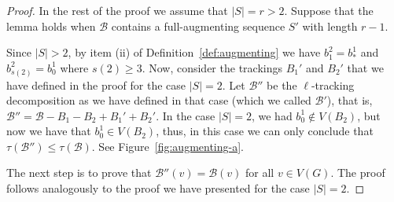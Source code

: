 \documentclass[12pt,reqno,a4paper]{amsart}
\newcommand{\B}{\mathcal{B}}
\newcommand{\full}{full}
\def\vertices{\mathop{\text{\rm vert}}\nolimits}
\begin{document}
\begin{proof}
In the rest of the proof we assume that \(|S| = r> 2\). 
Suppose that the lemma holds when \(\B\) contains a \full-augmenting sequence \(S'\)
with length \(r-1\).

Since \(|S| > 2\),
by item (ii) of Definition~\ref{def:augmenting} we have
\(b_1^2 = b_{*}^1\)
and \(b_{s(2)}^2=b_0^1\)
where \(s(2) \geq 3\).
Now, consider the trackings $B_1'$ and $B_2'$ that we have
  defined in the proof for the case $|S|=2$. Let $\B''$ be the
  $\ell$-tracking decomposition as we have defined in that case (which we
  called $\B'$), that is, \(\B'' = \B - B_1 - B_2 + B_1' + B_2'\).
  In the case $|S|=2$, we had $b_0^1\notin V(B_2)$, but now we have
  that $b_0^1\in V(B_2)$, thus, in this case we can only conclude that
  \(\tau(\B'') \leq \tau(\B)\).  See Figure~\ref{fig:augmenting-a}.




The next step is to prove that \(\B''(v) = \B(v)\) for all $v\in
V(G)$. The proof follows analogously to the proof we have presented 
for the case $|S|=2$. 



\end{proof}
\end{document}
